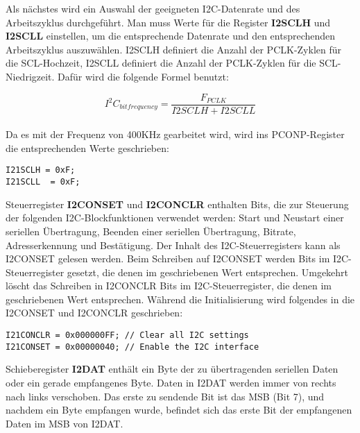 Als nächstes wird ein Auswahl der geeigneten I2C-Datenrate und des Arbeitszyklus durchgeführt. Man muss Werte für die Register \textbf{I2SCLH} und \textbf{I2SCLL} einstellen, um die entsprechende Datenrate und den entsprechenden Arbeitszyklus auszuwählen. I2SCLH definiert die Anzahl der PCLK-Zyklen für die SCL-Hochzeit, I2SCLL definiert die Anzahl der PCLK-Zyklen für die SCL-Niedrigzeit. Dafür wird die folgende Formel benutzt:

\begin{equation}
I^2C_{bitfrequency} =  \frac{F_{PCLK}}{I2SCLH + I2SCLL }
\end{equation}\\

Da es mit der Frequenz von 400KHz gearbeitet wird, wird ins PCONP-Register die entsprechenden Werte geschrieben:
\begin{lstlisting}
I21SCLH = 0xF;
I21SCLL  = 0xF;
\end{lstlisting}

Steuerregister \textbf{I2CONSET} und \textbf{I2CONCLR} enthalten Bits, die zur Steuerung der folgenden I2C-Blockfunktionen verwendet werden: Start und Neustart einer seriellen Übertragung, Beenden einer seriellen Übertragung, Bitrate, Adresserkennung und Bestätigung. Der Inhalt des I2C-Steuerregisters kann als I2CONSET gelesen werden. Beim Schreiben auf I2CONSET werden Bits im I2C-Steuerregister gesetzt, die denen im geschriebenen Wert entsprechen. Umgekehrt löscht das Schreiben in I2CONCLR Bits im I2C-Steuerregister, die denen im geschriebenen Wert entsprechen. Während die Initialisierung wird folgendes in die I2CONSET und I2CONCLR geschrieben: 

\begin{lstlisting}
I21CONCLR = 0x000000FF; // Clear all I2C settings
I21CONSET = 0x00000040; // Enable the I2C interface
\end{lstlisting}

Schieberegister \textbf{I2DAT} enthält ein Byte der zu übertragenden seriellen Daten oder ein gerade empfangenes Byte. Daten in I2DAT werden immer von rechts nach links verschoben. Das erste zu sendende Bit ist das MSB (Bit 7), und nachdem ein Byte empfangen wurde, befindet sich das erste Bit der empfangenen Daten im MSB von I2DAT. 

